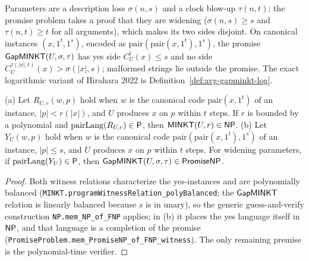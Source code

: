\begin{definition}[$\cc{GapMINKT}$]
  \label{def:meta-gapminkt}
  \leanok
  Parameters are a description loss $\sigma(n, s)$ and a clock blow-up
  $\tau(n, t)$; the promise problem takes a proof that they are widening
  ($\sigma(n,s) \ge s$ and $\tau(n,t) \ge t$ for all arguments), which makes
  its two sides disjoint. On canonical instances $(x, 1^t, 1^s)$, encoded as
  $\mathrm{pair}(\mathrm{pair}(x, 1^t), 1^s)$, the promise
  $\mathsf{GapMINKT}(U, \sigma, \tau)$ has yes side $C^t_U(x) \le s$ and no side
  $C^{\tau(|x|,t)}_U(x) > \sigma(|x|, s)$; malformed strings lie outside the
  promise. The exact logarithmic variant of Hirahara 2022 is
  Definition~\ref{def:avg-gapminkt-log}.
\end{definition}

\begin{theorem}
  \label{thm:meta-minkt-np-conditional}
  \leanok
  (a) Let $R_{U,r}(w, p)$ hold when $w$ is the canonical code
  $\mathrm{pair}(x,1^t)$ of an instance, $|p| < r(|x|)$, and $U$ produces $x$
  on $p$ within $t$ steps. If $r$ is bounded by a polynomial and
  $\mathrm{pairLang}(R_{U,r}) \in \mathsf{P}$, then $\mathsf{MINKT}(U, r) \in
  \mathsf{NP}$. (b) Let $Y_U(w, p)$ hold when $w$ is the canonical code
  $\mathrm{pair}(\mathrm{pair}(x,1^t),1^s)$ of an instance, $|p| \le s$, and
  $U$ produces $x$ on $p$ within $t$ steps. For widening parameters, if
  $\mathrm{pairLang}(Y_U) \in \mathsf{P}$, then
  $\mathsf{GapMINKT}(U, \sigma, \tau) \in \mathsf{PromiseNP}$.
\end{theorem}
\begin{proof}
  \leanok
  Both witness relations characterize the yes-instances and are polynomially
  balanced (\texttt{MINKT.programWitnessRelation\_polyBalanced}; the
  $\cc{GapMINKT}$ relation is linearly balanced because $s$ is in unary), so the
  generic guess-and-verify construction \texttt{NP.mem\_NP\_of\_FNP} applies;
  in (b) it places the yes language itself in $\mathsf{NP}$, and that language is
  a completion of the promise
  (\texttt{PromiseProblem.mem\_PromiseNP\_of\_FNP\_witness}). The only
  remaining premise is the polynomial-time verifier.
\end{proof}

